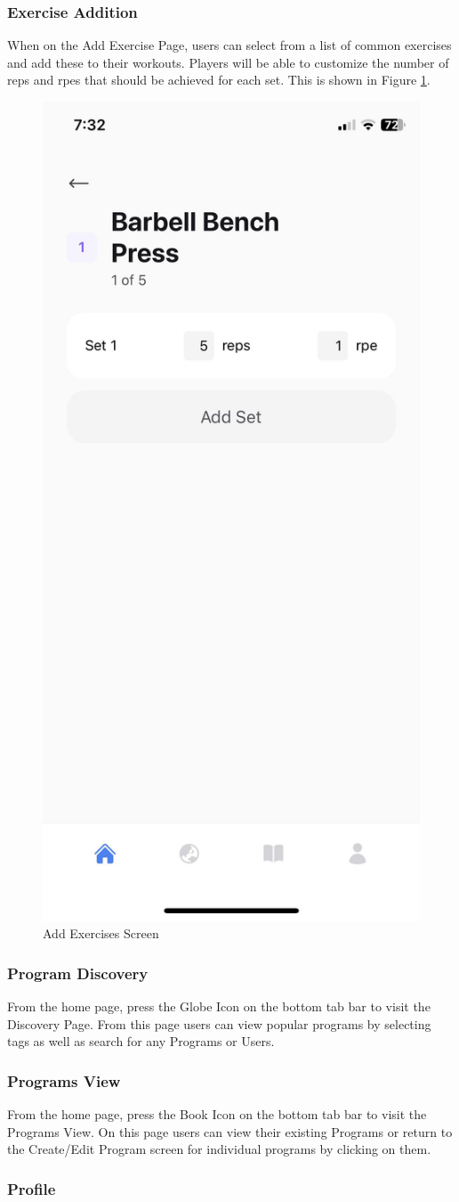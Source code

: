 \documentclass{article}
\begin{document}
\subsubsection{Exercise Addition}

When on the Add Exercise Page, users can select from a list of common exercises and add these to their workouts. Players will be able to customize the number of reps and rpes that should be achieved for each set. This is shown in Figure \ref{FigAddExercises}.

\begin{figure}[H]
    \centering
    \includegraphics[height=0.6\textwidth]{imgs/SetExercise.jpg}
    \caption{Add Exercises Screen}
    \label{FigAddExercises}
    \end{figure}

\subsubsection{Program Discovery}

From the home page, press the Globe Icon on the bottom tab bar to visit the Discovery Page. From this page users can view popular programs by selecting tags as well as search for any Programs or Users.

\subsubsection{Programs View}

From the home page, press the Book Icon on the bottom tab bar to visit the Programs View. On this page users can view their existing Programs or return to the Create/Edit Program screen for individual programs by clicking on them.

\subsubsection{Profile}
\end{document}
